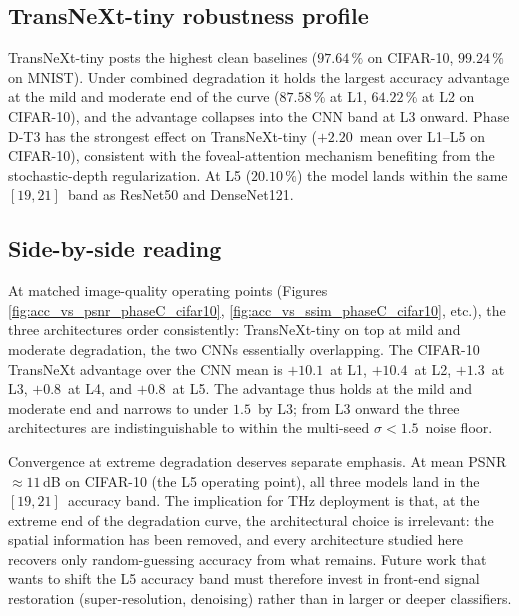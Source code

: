 \subsection{TransNeXt-tiny robustness profile}
\label{sec:cm:transnext}

TransNeXt-tiny posts the highest clean baselines ($97.64\,\%$ on
CIFAR-10, $99.24\,\%$ on MNIST). Under combined degradation it holds the
largest accuracy advantage at the mild and moderate end of the curve
($87.58\,\%$ at L1, $64.22\,\%$ at L2 on CIFAR-10), and the advantage
collapses into the CNN band at L3 onward. Phase D-T3 has the strongest
effect on TransNeXt-tiny ($+2.20\,$\Mpp{} mean over L1--L5 on CIFAR-10),
consistent with the foveal-attention mechanism benefiting from the
stochastic-depth regularization. At L5 ($20.10\,\%$) the model lands
within the same $[19, 21]\,$\Mpp{} band as ResNet50 and DenseNet121.

\subsection{Side-by-side reading}
\label{sec:cm:sidebyside}

At matched image-quality operating points
(Figures \ref{fig:acc_vs_psnr_phaseC_cifar10},
\ref{fig:acc_vs_ssim_phaseC_cifar10}, etc.), the three architectures
order consistently: TransNeXt-tiny on top at mild and moderate
degradation, the two CNNs essentially overlapping. The CIFAR-10
TransNeXt advantage over the CNN mean is $+10.1\,$\Mpp{} at L1,
$+10.4\,$\Mpp{} at L2, $+1.3\,$\Mpp{} at L3, $+0.8\,$\Mpp{} at L4,
and $+0.8\,$\Mpp{} at L5. The advantage thus holds at the mild and
moderate end and narrows to under $1.5\,$\Mpp{} by L3; from L3 onward
the three architectures are indistinguishable to within the multi-seed
$\sigma < 1.5\,$\Mpp{} noise floor.

Convergence at extreme degradation deserves separate emphasis. At mean
PSNR $\approx 11\,$dB on CIFAR-10 (the L5 operating point), all three
models land in the $[19, 21]\,$\Mpp{} accuracy band. The implication
for THz deployment is that, at the extreme end of the degradation
curve, the architectural choice is irrelevant: the spatial information
has been removed, and every architecture studied here recovers only
random-guessing accuracy from what remains. Future work that wants to
shift the L5 accuracy band must therefore invest in front-end signal
restoration (super-resolution, denoising) rather than in larger or
deeper classifiers.
